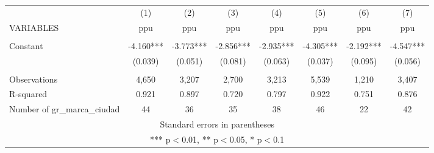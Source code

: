 \begin{tabular}{lccccccc} \hline
 & (1) & (2) & (3) & (4) & (5) & (6) & (7) \\
VARIABLES & ppu & ppu & ppu & ppu & ppu & ppu & ppu \\ \hline
 &  &  &  &  &  &  &  \\
Constant & -4.160*** & -3.773*** & -2.856*** & -2.935*** & -4.305*** & -2.192*** & -4.547*** \\
 & (0.039) & (0.051) & (0.081) & (0.063) & (0.037) & (0.095) & (0.056) \\
 &  &  &  &  &  &  &  \\
Observations & 4,650 & 3,207 & 2,700 & 3,213 & 5,539 & 1,210 & 3,407 \\
R-squared & 0.921 & 0.897 & 0.720 & 0.797 & 0.922 & 0.751 & 0.876 \\
 Number of gr\_marca\_ciudad & 44 & 36 & 35 & 38 & 46 & 22 & 42 \\ \hline
\multicolumn{8}{c}{ Standard errors in parentheses} \\
\multicolumn{8}{c}{ *** p$<$0.01, ** p$<$0.05, * p$<$0.1} \\
\end{tabular}
